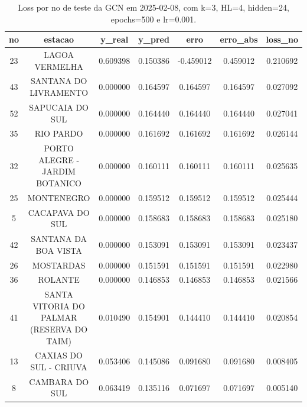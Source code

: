\begin{table}[h]
\centering
\caption{Loss por no de teste da GCN em 2025-02-08, com k=3, HL=4, hidden=24, epochs=500 e lr=0.001.}
\label{tab:gcn_loss_k3_hl4_h24_e500_d20250208}
\begin{tabular}{ccccccc}
\toprule
no & estacao & y\_real & y\_pred & erro & erro\_abs & loss\_no \\
\midrule
23 & LAGOA VERMELHA & 0.609398 & 0.150386 & -0.459012 & 0.459012 & 0.210692 \\
43 & SANTANA DO LIVRAMENTO & 0.000000 & 0.164597 & 0.164597 & 0.164597 & 0.027092 \\
52 & SAPUCAIA DO SUL & 0.000000 & 0.164440 & 0.164440 & 0.164440 & 0.027041 \\
35 & RIO PARDO & 0.000000 & 0.161692 & 0.161692 & 0.161692 & 0.026144 \\
32 & PORTO ALEGRE - JARDIM BOTANICO & 0.000000 & 0.160111 & 0.160111 & 0.160111 & 0.025635 \\
25 & MONTENEGRO & 0.000000 & 0.159512 & 0.159512 & 0.159512 & 0.025444 \\
5 & CACAPAVA DO SUL & 0.000000 & 0.158683 & 0.158683 & 0.158683 & 0.025180 \\
42 & SANTANA DA BOA VISTA & 0.000000 & 0.153091 & 0.153091 & 0.153091 & 0.023437 \\
26 & MOSTARDAS & 0.000000 & 0.151591 & 0.151591 & 0.151591 & 0.022980 \\
36 & ROLANTE & 0.000000 & 0.146853 & 0.146853 & 0.146853 & 0.021566 \\
41 & SANTA VITORIA DO PALMAR (RESERVA DO TAIM) & 0.010490 & 0.154901 & 0.144410 & 0.144410 & 0.020854 \\
13 & CAXIAS DO SUL - CRIUVA & 0.053406 & 0.145086 & 0.091680 & 0.091680 & 0.008405 \\
8 & CAMBARA DO SUL & 0.063419 & 0.135116 & 0.071697 & 0.071697 & 0.005140 \\
\bottomrule
\end{tabular}
\end{table}
